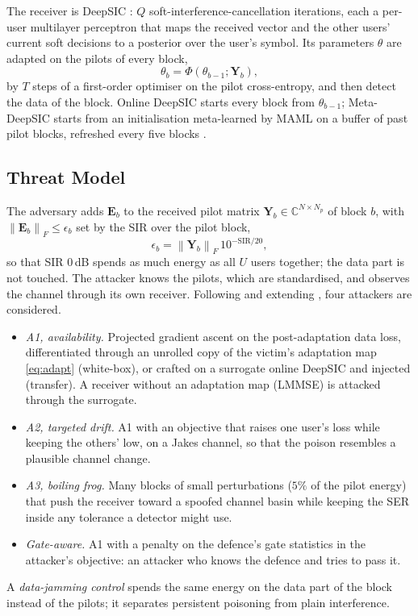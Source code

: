 \documentclass[journal]{IEEEtran}
\newcommand{\norm}[1]{\left\lVert #1 \right\rVert}
\begin{document}
The receiver is DeepSIC \cite{shlezinger2021}: $Q$ soft-interference-cancellation
iterations, each a per-user multilayer perceptron that maps the received vector and the
other users' current soft decisions to a posterior over the user's symbol. Its
parameters $\theta$ are adapted on the pilots of every block,
\begin{equation}\label{eq:adapt}
\theta_b=\Phi(\theta_{b-1};\bm Y_b),
\end{equation}
by $T$ steps of a first-order optimiser on the pilot cross-entropy, and then detect the
data of the block. Online DeepSIC starts every block from $\theta_{b-1}$; Meta-DeepSIC
starts from an initialisation meta-learned by MAML \cite{finn2017} on a buffer of past
pilot blocks, refreshed every five blocks \cite{raviv2023}.

\subsection{Threat Model}
The adversary adds $\bm E_b$ to the received pilot matrix $\bm Y_b\in\mathbb{C}^{N\times
N_p}$ of block $b$, with $\norm{\bm E_b}_F\le\epsilon_b$ set by the SIR over the pilot
block,
\begin{equation}\label{eq:budget}
\epsilon_b=\norm{\bm Y_b}_F\,10^{-\mathrm{SIR}/20},
\end{equation}
so that SIR $0$\,dB spends as much energy as all $U$ users together; the data part is not
touched. The attacker knows the pilots, which are standardised, and observes the channel
through its own receiver. Following and extending \cite{wu2024}, four attackers are
considered.
\begin{itemize}
\item \emph{A1, availability.} Projected gradient ascent \cite{madry2018} on the
post-adaptation data loss, differentiated through an unrolled copy of the victim's
adaptation map \eqref{eq:adapt} (white-box), or crafted on a surrogate online DeepSIC
and injected (transfer). A receiver without an adaptation map (LMMSE) is attacked through
the surrogate.
\item \emph{A2, targeted drift.} A1 with an objective that raises one user's loss while
keeping the others' low, on a Jakes channel, so that the poison resembles a plausible
channel change.
\item \emph{A3, boiling frog.} Many blocks of small perturbations ($5\%$ of the pilot
energy) that push the receiver toward a spoofed channel basin while keeping the SER
inside any tolerance a detector might use.
\item \emph{Gate-aware.} A1 with a penalty on the defence's gate statistics in the
attacker's objective: an attacker who knows the defence and tries to pass it.
\end{itemize}
A \emph{data-jamming control} spends the same energy on the data part of the block
instead of the pilots; it separates persistent poisoning from plain interference.
\end{document}
